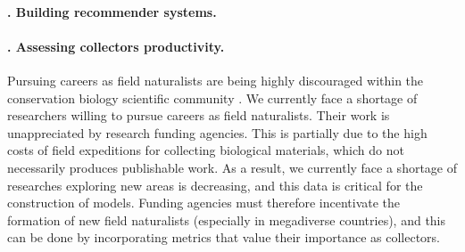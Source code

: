 \paragraph*{\theApplicationCase. Building recommender systems.}




\paragraph*{\theApplicationCase. Assessing collectors productivity.}
Pursuing careers as field naturalists are being highly discouraged within the conservation biology scientific community \cite{Noss1996}.
We currently face a shortage of researchers willing to pursue careers as field naturalists.
Their work is unappreciated by research funding agencies.
This is partially due to the high costs of field expeditions for collecting biological materials, which do not necessarily produces publishable work.
As a result, we currently face a shortage of researches exploring new areas is decreasing, and this data is critical for the construction of models.
Funding agencies must therefore incentivate the formation of new field naturalists (especially in megadiverse countries), and this can be done by incorporating metrics that value their importance as collectors.

